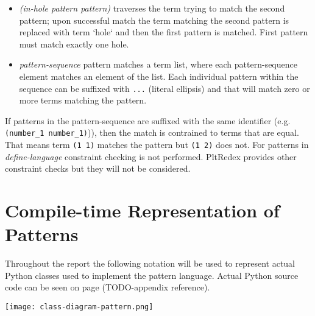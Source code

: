 \begin{itemize}
\item
\textit{(in-hole pattern pattern)} traverses the term trying to match the second pattern; upon successful match the term matching the second pattern is replaced with term `hole` and then the first pattern is matched. First pattern must match exactly one hole.

\item
\textit{pattern-sequence} pattern matches a term list, where each pattern-sequence element matches an element of the list. Each individual pattern within the sequence can be suffixed with \texttt{...} (literal ellipsis) and that will match zero or more terms matching the pattern.
\end{itemize}

If patterns in the pattern-sequence are suffixed with the same identifier (e.g. \texttt{(number\_1 number\_1)})), then the match is contrained to terms that are equal. That means term \texttt{(1 1)} matches the pattern but \texttt{(1 2)} does not. For patterns in \textit{define-language} constraint checking is not performed. PltRedex provides other constraint checks but they will not be considered.

\section{Compile-time Representation of Patterns}

Throughout the report the following notation will be used to represent actual Python classes used to implement the pattern language. Actual Python source code can be seen on page (TODO-appendix reference). 

\texttt{[image: class-diagram-pattern.png]}


